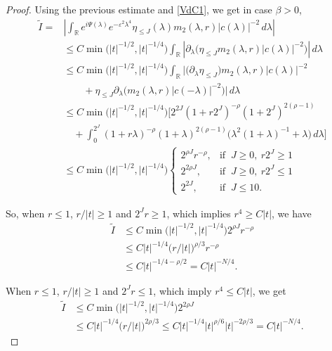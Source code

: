 \documentclass[10pt,leqno]{amsart}
\numberwithin{equation}{section}
\newcommand{\field}[1]{\mathbb{#1}}
\newcommand{\R}{\field{R}}          		%
\begin{document}
\begin{proof}
Using the previous estimate and \eqref{VdC1}, we get in case $\beta > 0$,
\begin{align*}
\tilde{I}=&\left|\int_\R e^{i\Psi(\lambda)}e^{-\varepsilon^2 \lambda^4} \eta_{\leq J}(\lambda) m_2 (\lambda ,r)| c(\lambda )|^{-2}\, d\lambda\right|\\
&\leq C \min \big(|t|^{-1/2},|t|^{-1/4}\big) \int_{\R}\left|\partial_\lambda \big(\eta_{\leq J} m_2 (\lambda ,r) |c(\lambda)|^{-2} \big)\right|\, d\lambda     \\
&\leq C  \min \big(|t|^{-1/2},|t|^{-1/4}\big) \int_{\R}\Big| \big(\partial_\lambda \eta_{\leq J}\big) m_2 (\lambda ,r) |c(\lambda)|^{-2} \\
&\qquad + \eta_{\leq J} \partial_\lambda \big(m_2 (\lambda ,r) |c(-\lambda)|^{-2}\big)\Big|\, d\lambda\\
&\leq C \min \big(|t|^{-1/2},|t|^{-1/4}\big)\Big[  2^{2J}(1+r 2^J)^{-\rho} (1+2^J)^{2(\rho -1)} \\
&\quad + \int_0^{2^J} (1+r\lambda)^{-\rho} (1+ \lambda)^{2(\rho -1)} \big(\lambda^{2} (1+\lambda)^{-1} +\lambda \big)\,d\lambda \Big]\\
&\leq C \min \big(|t|^{-1/2},|t|^{-1/4}\big) \begin{cases} 2^{\rho J}r^{-\rho},&\mbox{if }\ J\geq 0,\ r2^J \geq 1\\ 2^{2\rho J}   ,&\mbox{if }\ J\geq 0,\ r2^J \leq 1
\\ 2^{2J}  ,&\mbox{if }\ J\leq 10 . \end{cases}
 \end{align*}

So, when $r\leq 1$, $r/|t| \geq 1$ and $2^J r\geq 1$, which implies $r^4 \geq C|t|$, we have 
\begin{align*}
 \tilde{I}&\leq C \min \big(|t|^{-1/2},|t|^{-1/4}\big) 2^{\rho  J} r^{-\rho} \\
&\leq C |t|^{-1/4}  \big(r/|t|\big)^{\rho/3} r^{-\rho}\\
& \leq C |t|^{-1/4 - \rho /2}=C |t|^{-N/4}.  
\end{align*}


When $r\leq 1$, $r/|t| \geq 1$ and $2^J r\leq 1$, which imply $r^4 \leq C |t|$, we get
\begin{align*}
\tilde{I}& \leq C \min \big(|t|^{-1/2},|t|^{-1/4}\big) 2^{2\rho  J}\\
& \leq  C |t|^{-1/4}\big(r/|t|\big)^{2\rho/3} \leq C |t|^{-1/4}  |t|^{ \rho /6} |t|^{-2\rho /3}=C |t|^{-N/4}.   
\end{align*}


\end{proof}
\end{document}
